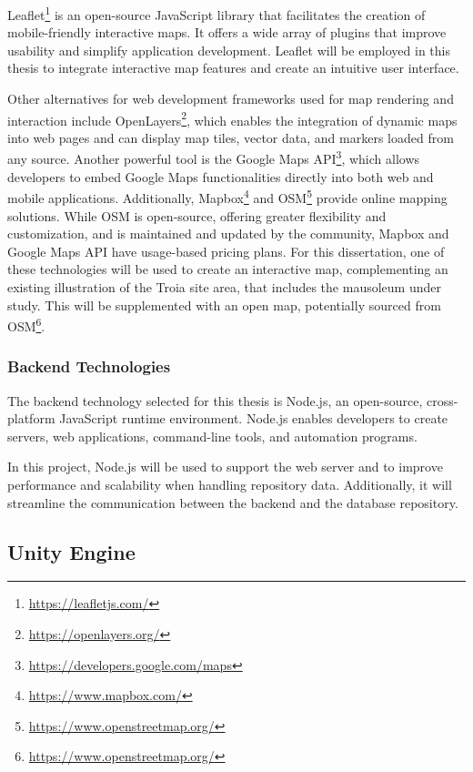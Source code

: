 Leaflet\footnote{\url{https://leafletjs.com/}} is an open-source JavaScript library that facilitates the creation of mobile-friendly interactive maps. It offers a wide array of plugins that improve usability and simplify application development.
Leaflet will be employed in this thesis to integrate interactive map features and create an intuitive user interface.

Other alternatives for web development frameworks used for map rendering and interaction include OpenLayers\footnote{\url{https://openlayers.org/}}, which enables the integration of dynamic maps into web pages and can display map tiles, vector data, and markers loaded from any source.
Another powerful tool is the Google Maps API\footnote{\url{https://developers.google.com/maps}}, which allows developers to embed Google Maps functionalities directly into both web and mobile applications.
Additionally, Mapbox\footnote{\url{https://www.mapbox.com/}} and \gls{OSM}\footnote{\url{https://www.openstreetmap.org/}} provide online mapping solutions. While \gls{OSM} is open-source, offering greater flexibility and customization, and is maintained and updated by the community, Mapbox and Google Maps API have usage-based pricing plans.
For this dissertation, one of these technologies will be used to create an interactive map, complementing an existing illustration of the Troia site area, that includes the mausoleum under study. This will be supplemented with an open map, potentially sourced from \gls{OSM}\footnote{\url{https://www.openstreetmap.org/}}.

\subsubsection{Backend Technologies}
\label{sec:backend} 

The backend technology selected for this thesis is Node.js, an open-source, cross-platform JavaScript runtime environment. Node.js enables developers to create servers, web applications, command-line tools, and automation programs.

In this project, Node.js will be used to support the web server and to improve performance and scalability when handling repository data. Additionally, it will streamline the communication between the backend and the database repository.


\subsection{Unity Engine}
\label{sec:unity_description} 

